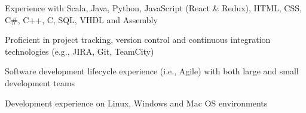 \begin{cvitems}
\sectionspace
\sectionspace
\vspace{1mm}
	\fontsize{11pt}{1.4em}\bodyfontlight\upshape\color{text}
        \item {Experience with Scala, Java, Python, JavaScript (React \& Redux), HTML, CSS, C\#, C++, C, SQL, VHDL and Assembly}
        \item {Proficient in project tracking, version control and continuous integration technologies (e.g., JIRA, Git, TeamCity)}
        \item {Software development lifecycle experience (i.e., Agile) with both large and small development teams}
        \item {Development experience on Linux, Windows and Mac OS environments}
        \end{cvitems}
\vspace{1mm}
\sectionspace